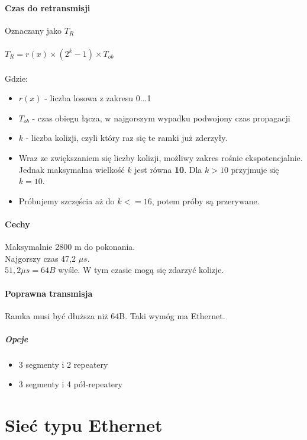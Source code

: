 		\subsection{Czas do retransmisji}
			Oznaczany jako $ T_{R} $\\\\
			$ T_{R} = r(x)\times (2^{k}-1)\times T_{ob}$\\\\Gdzie:\\
			\begin{itemize}
				\item $ r(x) $ - liczba losowa z zakresu 0...1
				\item $ T_{ob} $ - czas obiegu łącza, w najgorszym wypadku podwojony czas propagacji
				\item $ k $ - liczba kolizji, czyli który raz się te ramki już zderzyły.
				\item Wraz ze zwiększaniem się liczby kolizji, możliwy zakres rośnie ekspotencjalnie. Jednak maksymalna wielkość $ k $ jest równa \textbf{10}. Dla $ k > 10 $ przyjmuje się $ k=10 $.
				\item Próbujemy szczęścia aż do $ k <=16 $, potem próby są przerywane.
			\end{itemize}
		\subsection{Cechy}
			Maksymalnie 2800 m do pokonania.\\
			Najgorszy czas 47,2 $ \mu s $.\\
			$ 51,2 \mu s=64B $ wyśle. W tym czasie mogą się zdarzyć kolizje.
		\subsection{Poprawna transmisja}
			Ramka musi być dłuższa niż 64B. Taki wymóg ma Ethernet.
			\subsubsection{Opcje}
				\begin{itemize}
					\item 3 segmenty i 2 repeatery
					\item 3 segmenty i 4 pół-repeatery
				\end{itemize}


\part{Sieć typu Ethernet}
